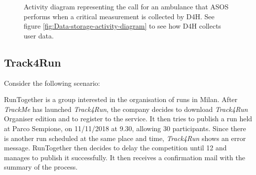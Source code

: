             \begin{figure}[H]
                \centering
                \caption{Activity diagram representing the call for an ambulance that ASOS performs when a critical measurement is collected by D4H. See figure \ref{fig:Data-storage-activity-diagram} to see how D4H collects user data.}
                \label{fig:ASOS-activity-diagram1}
            \end{figure}
            
    \subsection{Track4Run}
        Consider the following scenario:
        
        RunTogether is a group interested in the organisation of runs in Milan. After \emph{TrackMe} has launched \emph{Track4Run}, the company decides to download \emph{Track4Run} Organiser edition and to register to the service. It then tries to publish a run held at Parco Sempione, on 11/11/2018 at 9.30, allowing 30 participants. Since there is another run scheduled at the same place and time, \emph{Track4Run} shows an error message. RunTogether then decides to delay the competition until 12 and manages to publish it successfully. It then receives a confirmation mail with the summary of the process.
        
